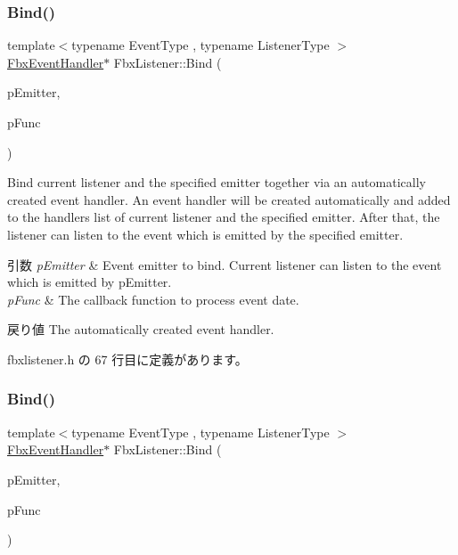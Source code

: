\subsubsection{\texorpdfstring{Bind()}{Bind()}\hspace{0.1cm}{\footnotesize\ttfamily [1/3]}}
{\footnotesize\ttfamily template$<$typename Event\+Type , typename Listener\+Type $>$ \\
\hyperlink{class_fbx_event_handler}{Fbx\+Event\+Handler}$\ast$ Fbx\+Listener\+::\+Bind (\begin{DoxyParamCaption}\item[{\hyperlink{class_fbx_emitter}{Fbx\+Emitter} \&}]{p\+Emitter,  }\item[{void(Listener\+Type\+::$\ast$)(const Event\+Type $\ast$)}]{p\+Func }\end{DoxyParamCaption})\hspace{0.3cm}{\ttfamily [inline]}}

Bind current listener and the specified emitter together via an automatically created event handler. An event handler will be created automatically and added to the handlers list of current listener and the specified emitter. After that, the listener can listen to the event which is emitted by the specified emitter. 
\begin{DoxyParams}{引数}
{\em p\+Emitter} & Event emitter to bind. Current listener can listen to the event which is emitted by p\+Emitter. \\
\hline
{\em p\+Func} & The callback function to process event date. \\
\hline
\end{DoxyParams}
\begin{DoxyReturn}{戻り値}
The automatically created event handler. 
\end{DoxyReturn}


 fbxlistener.\+h の 67 行目に定義があります。

\mbox{\label{class_fbx_listener_a2c3413cf0a62389613102a6ed9727ed1}} 
\subsubsection{\texorpdfstring{Bind()}{Bind()}\hspace{0.1cm}{\footnotesize\ttfamily [2/3]}}
{\footnotesize\ttfamily template$<$typename Event\+Type , typename Listener\+Type $>$ \\
\hyperlink{class_fbx_event_handler}{Fbx\+Event\+Handler}$\ast$ Fbx\+Listener\+::\+Bind (\begin{DoxyParamCaption}\item[{\hyperlink{class_fbx_emitter}{Fbx\+Emitter} \&}]{p\+Emitter,  }\item[{void(Listener\+Type\+::$\ast$)(const Event\+Type $\ast$) const}]{p\+Func }\end{DoxyParamCaption})\hspace{0.3cm}{\ttfamily [inline]}}

